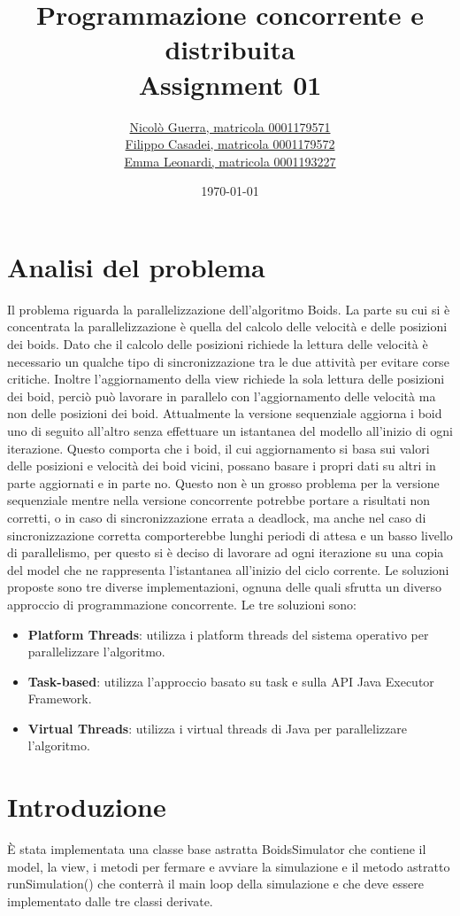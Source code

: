 \documentclass[11pt,notitlepage]{article}
\title{Programmazione concorrente e distribuita \\ Assignment 01}
\author{
    \href{mailto:nicolo.guerra@studio.unibo.it}{Nicolò Guerra, matricola 0001179571} \\
    \href{mailto:filippo.casadei9@studio.unibo.it}{Filippo Casadei, matricola 0001179572} \\
    \href{mailto:emma.leonardi2@studio.unibo.it}{Emma Leonardi, matricola 0001193227}
    }
\date{\today}
\begin{document}
\maketitle
\renewcommand{\thesection}{\arabic{section}}
\section{Analisi del problema}
Il problema riguarda la parallelizzazione dell'algoritmo Boids. La parte su cui si è concentrata la parallelizzazione è quella del calcolo delle velocità e delle posizioni dei 
boids. Dato che il calcolo delle posizioni richiede la lettura delle velocità è necessario un qualche tipo di sincronizzazione tra le due attività per evitare corse critiche.
Inoltre l'aggiornamento della view richiede la sola lettura delle posizioni dei boid, perciò può lavorare in parallelo con l'aggiornamento delle velocità ma non delle posizioni dei boid.
Attualmente la versione sequenziale aggiorna i boid uno di seguito all'altro senza effettuare un istantanea del modello all'inizio di ogni iterazione. Questo comporta che i boid,
il cui aggiornamento si basa sui valori delle posizioni e velocità dei boid vicini, possano basare i propri dati su altri in parte aggiornati e in parte no. Questo non è un grosso
problema per la versione sequenziale mentre nella versione concorrente potrebbe portare a risultati non corretti, o in caso di sincronizzazione errata a deadlock, ma anche nel caso di
sincronizzazione corretta comporterebbe lunghi periodi di attesa e un basso livello di parallelismo, per questo si è deciso di lavorare ad ogni iterazione su una copia del model che ne 
rappresenta l'istantanea all'inizio del ciclo corrente.
Le soluzioni proposte sono tre diverse implementazioni, ognuna delle quali sfrutta un diverso approccio di programmazione concorrente. 
Le tre soluzioni sono: 
\begin{itemize}
    \item \textbf{Platform Threads}: utilizza i platform threads del sistema operativo per parallelizzare l'algoritmo.
    \item \textbf{Task-based}: utilizza l'approccio basato su task e sulla API Java Executor Framework.
    \item \textbf{Virtual Threads}: utilizza i virtual threads di Java per parallelizzare l'algoritmo.
\end{itemize}

\section{Introduzione}
È stata implementata una classe base astratta \textsf{BoidsSimulator} che contiene il model, la view, i metodi per fermare e avviare la simulazione e il metodo astratto 
\textsf{runSimulation()} che conterrà il main loop della simulazione e che deve essere implementato dalle tre classi derivate.
\end{document}
